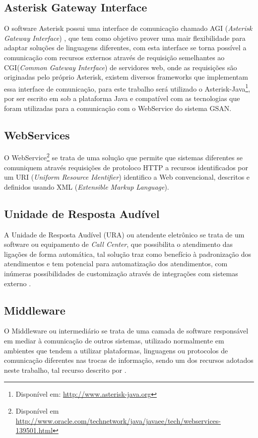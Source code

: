 \subsection{Asterisk Gateway Interface}
O software Asterisk possui uma interface de comunicação chamado AGI (\textit{Asterisk Gateway Interface}) \cite{asteriskAgi}, que tem como objetivo prover uma mair flexibilidade para adaptar soluções de linguagens diferentes, com esta interface se torna possível a comunicação com recursos externos através de requisição semelhantes ao CGI(\textit{Common Gateway Interface}) de servidores web, onde as requisições são originadas pelo próprio Asterisk, existem diversos frameworks que implementam essa interface de comunicação, para este trabalho  será utilizado o Asterisk-Java\footnote{Disponível em: \url{http://www.asterisk-java.org}}, por ser escrito em sob a plataforma Java e compatível com as tecnologias que foram utilizadas para a comunicação com o WebService do sistema GSAN.

\subsection{WebServices}
O WebService\footnote{Disponível em \url{http://www.oracle.com/technetwork/java/javaee/tech/webservices-139501.html}} se trata de uma solução que permite que sistemas diferentes se comuniquem através requisições de protoloco HTTP a recursos identificados por um URI (\textit{Uniform Resource Identifier}) identifico a Web convencional, descritos e definidos usando XML (\textit{Extensible Markup Language}).

\subsection{Unidade de Resposta Audível}
A Unidade de Resposta Audível (URA) ou atendente eletrônico se trata de um software ou equipamento de \textit{Call Center}, que possibilita o atendimento das ligações de forma automática, tal solução traz como benefício à padronização dos atendimentos e tem potencial para automatização dos atendimentos, com inúmeras possibilidades de customização através de integrações com sistemas externo \cite{VIEIRA:2007}.

\subsection{Middleware}
O Middleware ou intermediário se trata de uma camada de software responsável em mediar à comunicação de outros sistemas, utilizado normalmente em ambientes que tendem a utilizar plataformas, linguagens ou protocolos de comunicação diferentes nas trocas de informação, sendo um dos recursos adotados neste trabalho, tal recurso descrito por .

